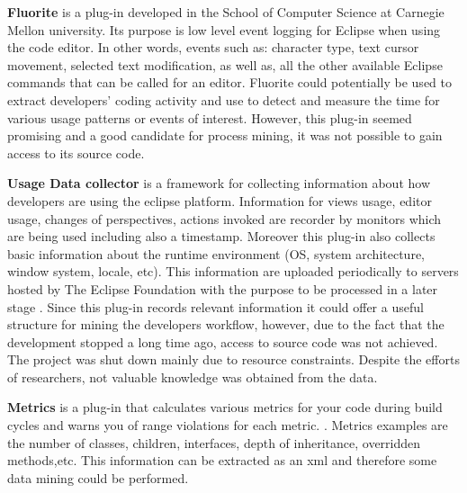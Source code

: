 \textbf{Fluorite} is a plug-in developed in the School of Computer Science 
at Carnegie Mellon university. Its purpose is low level event logging 
for Eclipse when using the code editor. In other words, events such as: \cite{Yoon2011}
character type, text cursor movement, 
selected text modification, as well as, all
the other available Eclipse commands that can be called for an editor.
Fluorite could potentially be used to extract developers' coding 
activity and use to detect and measure the time for various usage 
patterns or events of interest. However, this plug-in seemed promising 
and a good candidate for process mining, it was not possible to gain 
access to its source code.
 
\textbf{Usage Data collector} is a framework for collecting information about how developers 
are using the eclipse platform. Information for views usage, editor usage, 
changes of perspectives, actions invoked are recorder by monitors which
are being used including also a timestamp. Moreover this plug-in also collects 
basic information about the runtime environment (OS, system architecture, window system, 
locale, etc). This information are uploaded periodically to servers hosted by The Eclipse 
Foundation with the purpose to be processed in a later stage .
Since this plug-in records relevant information it could offer a useful structure for mining the developers workflow, 
however, due to the fact that the development stopped a long time ago, access to source code was not achieved.
The project was shut down mainly due to resource constraints. Despite the efforts of researchers, not valuable 
knowledge was obtained from the data. 

\textbf{Metrics} is a plug-in that calculates various metrics for your code during build cycles and warns you of range violations for each metric.
. 
Metrics examples are the number of classes, children, interfaces, depth of inheritance, overridden methods,etc.
This information can be extracted as an xml and therefore some data mining could be performed.

